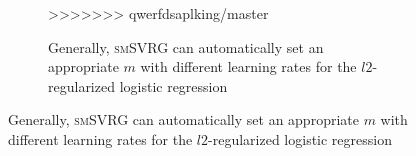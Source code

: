 \documentclass[conference]{IEEEtran}
\begin{document}
\begin{itemize}
\begin{figure}[ht]
\begin{figure}[ht]
>>>>>>> qwerfdsaplking/master
\centering
{}

\caption{Generally, \textsc{smSVRG} can automatically set an appropriate $m$ with different learning rates for the $l2$-regularized logistic regression}
\label{figure_logistic_ijcnn1}
\end{figure}


\end{figure}
\end{itemize}
\end{document}
